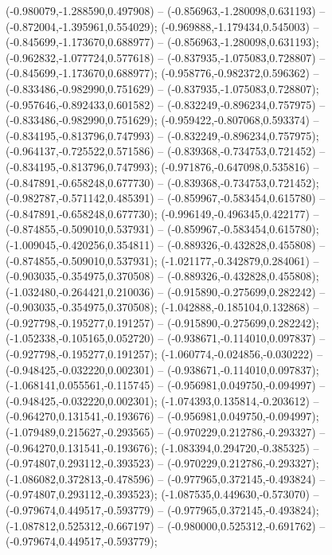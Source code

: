  (-0.980079,-1.288590,0.497908) -- (-0.856963,-1.280098,0.631193) -- (-0.872004,-1.395961,0.554029);
 (-0.969888,-1.179434,0.545003) -- (-0.845699,-1.173670,0.688977) -- (-0.856963,-1.280098,0.631193);
 (-0.962832,-1.077724,0.577618) -- (-0.837935,-1.075083,0.728807) -- (-0.845699,-1.173670,0.688977);
 (-0.958776,-0.982372,0.596362) -- (-0.833486,-0.982990,0.751629) -- (-0.837935,-1.075083,0.728807);
 (-0.957646,-0.892433,0.601582) -- (-0.832249,-0.896234,0.757975) -- (-0.833486,-0.982990,0.751629);
 (-0.959422,-0.807068,0.593374) -- (-0.834195,-0.813796,0.747993) -- (-0.832249,-0.896234,0.757975);
 (-0.964137,-0.725522,0.571586) -- (-0.839368,-0.734753,0.721452) -- (-0.834195,-0.813796,0.747993);
 (-0.971876,-0.647098,0.535816) -- (-0.847891,-0.658248,0.677730) -- (-0.839368,-0.734753,0.721452);
 (-0.982787,-0.571142,0.485391) -- (-0.859967,-0.583454,0.615780) -- (-0.847891,-0.658248,0.677730);
 (-0.996149,-0.496345,0.422177) -- (-0.874855,-0.509010,0.537931) -- (-0.859967,-0.583454,0.615780);
 (-1.009045,-0.420256,0.354811) -- (-0.889326,-0.432828,0.455808) -- (-0.874855,-0.509010,0.537931);
 (-1.021177,-0.342879,0.284061) -- (-0.903035,-0.354975,0.370508) -- (-0.889326,-0.432828,0.455808);
 (-1.032480,-0.264421,0.210036) -- (-0.915890,-0.275699,0.282242) -- (-0.903035,-0.354975,0.370508);
 (-1.042888,-0.185104,0.132868) -- (-0.927798,-0.195277,0.191257) -- (-0.915890,-0.275699,0.282242);
 (-1.052338,-0.105165,0.052720) -- (-0.938671,-0.114010,0.097837) -- (-0.927798,-0.195277,0.191257);
 (-1.060774,-0.024856,-0.030222) -- (-0.948425,-0.032220,0.002301) -- (-0.938671,-0.114010,0.097837);
 (-1.068141,0.055561,-0.115745) -- (-0.956981,0.049750,-0.094997) -- (-0.948425,-0.032220,0.002301);
 (-1.074393,0.135814,-0.203612) -- (-0.964270,0.131541,-0.193676) -- (-0.956981,0.049750,-0.094997);
 (-1.079489,0.215627,-0.293565) -- (-0.970229,0.212786,-0.293327) -- (-0.964270,0.131541,-0.193676);
 (-1.083394,0.294720,-0.385325) -- (-0.974807,0.293112,-0.393523) -- (-0.970229,0.212786,-0.293327);
 (-1.086082,0.372813,-0.478596) -- (-0.977965,0.372145,-0.493824) -- (-0.974807,0.293112,-0.393523);
 (-1.087535,0.449630,-0.573070) -- (-0.979674,0.449517,-0.593779) -- (-0.977965,0.372145,-0.493824);
 (-1.087812,0.525312,-0.667197) -- (-0.980000,0.525312,-0.691762) -- (-0.979674,0.449517,-0.593779);
